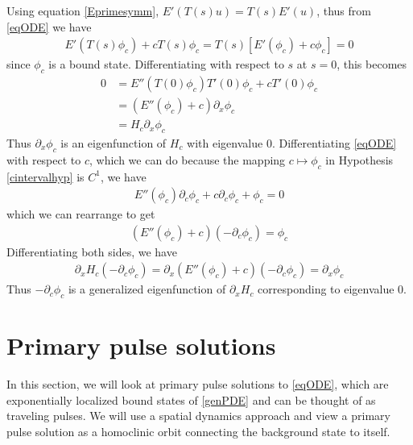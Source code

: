 \documentclass[thesis.tex]{subfiles}
\begin{document}
Using equation \eqref{Eprimesymm}, $E'(T(s)u) = T(s)E'(u)$, thus from \eqref{eqODE} we have
\begin{align}\label{TeqODE}
E'(T(s)\phi_c) + c T(s)\phi_c = T(s)[E'(\phi_c) + c \phi_c] = 0
\end{align}
since $\phi_c$ is a bound state. Differentiating with respect to $s$ at $s = 0$, this becomes
\begin{align*}
0 &= E''(T(0)\phi_c)T'(0)\phi_c + c T'(0)\phi_c \\
&= (E''(\phi_c) + c ) \partial_x \phi_c \\
&= H_c \partial_x \phi_c
\end{align*}
Thus $\partial_x \phi_c$ is an eigenfunction of $H_c$ with eigenvalue 0. Differentiating \eqref{eqODE} with respect to $c$, which we can do because the mapping $c \mapsto \phi_c$ in Hypothesis \ref{cintervalhyp} is $C^1$, we have
\begin{align*}
E''(\phi_c)\partial_c \phi_c + c \partial_c \phi_c + \phi_c = 0
\end{align*}
which we can rearrange to get 
\begin{align*}
(E''(\phi_c) + c )(-\partial_c \phi_c) = \phi_c
\end{align*}
Differentiating both sides, we have
\begin{align*}
\partial_x H_c (-\partial_c \phi_c) 
= \partial_x (E''(\phi_c) + c )(-\partial_c \phi_c) = \partial_x\phi_c
\end{align*}
Thus $-\partial_c \phi_c$ is a generalized eigenfunction of $\partial_x H_c$ corresponding to eigenvalue 0.

\section{Primary pulse solutions}

In this section, we will look at primary pulse solutions to \eqref{eqODE}, which are exponentially localized bound states of \eqref{genPDE} and can be thought of as traveling pulses. We will use a spatial dynamics approach and view a primary pulse solution as a homoclinic orbit connecting the background state to itself. 
\end{document}
